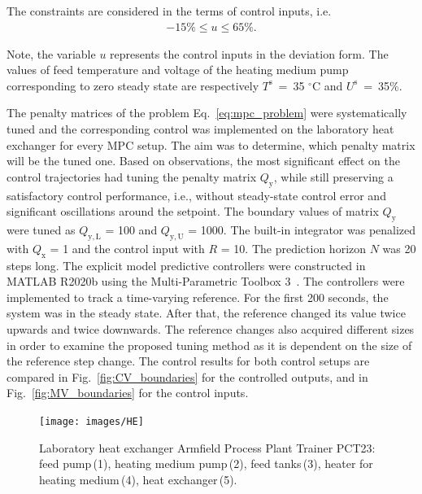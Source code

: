 \documentclass[preprint,12pt]{elsarticle}
\begin{document}
The constraints are considered in the terms of control inputs, i.e.
\begin{eqnarray}
\label{eq:u_const}
	-15\% \le u \le 65\%.
\end{eqnarray}

Note, the variable $u$ represents the control inputs in the deviation form. The values of feed temperature and voltage of the heating medium pump corresponding to zero steady state are respectively $T^\mathrm{s}$~=~35 $^{\circ}\mathrm{C}$ and $U^\mathrm{s}$~=~35\%.

The penalty matrices of the problem Eq.~\eqref{eq:mpc_problem} were systematically tuned and the corresponding control was implemented on the laboratory heat exchanger for every MPC setup. The aim was to determine, which penalty matrix will be the tuned one. Based on observations, the most significant effect on the control trajectories had tuning the penalty matrix $Q_\mathrm{y}$, while still preserving a satisfactory control performance, i.e., without steady-state control error and significant oscillations around the setpoint. The boundary values of matrix $Q_\mathrm{y}$ were tuned as $Q_\mathrm{y, L}$ = 100 and $Q_\mathrm{y, U}$ = 1000. The built-in integrator was penalized with $Q_\mathrm{x}$ = 1 and the control input with $R$ = 10. The prediction horizon $N$ was 20 steps long. The explicit model predictive controllers were constructed in MATLAB R2020b using the Multi-Parametric Toolbox 3~\cite{mpt_conf}. 
The controllers were implemented to track a time-varying reference. For the first 200 seconds, the system was in the steady state. After that, the reference changed its value twice upwards and twice downwards. The reference changes also acquired different sizes in order to examine the proposed tuning method as it is dependent on the size of the reference step change. The control results for both control setups are compared in Fig.~\ref{fig:CV_boundaries} for the controlled outputs, and in Fig.~\ref{fig:MV_boundaries} for the control inputs.
    

\begin{figure}
	\begin{center}
		\texttt{[image: images/HE]}
		\caption[Heat exchanger Armfield Process Plant Trainer PCT23]{Laboratory heat exchanger Armfield Process Plant Trainer PCT23: feed pump\,(1), heating medium pump\,(2), feed tanks\,(3), heater for heating medium\,(4), heat exchanger\,(5).}
		\label{fig:HE}
	\end{center}
\end{figure}
\end{document}
